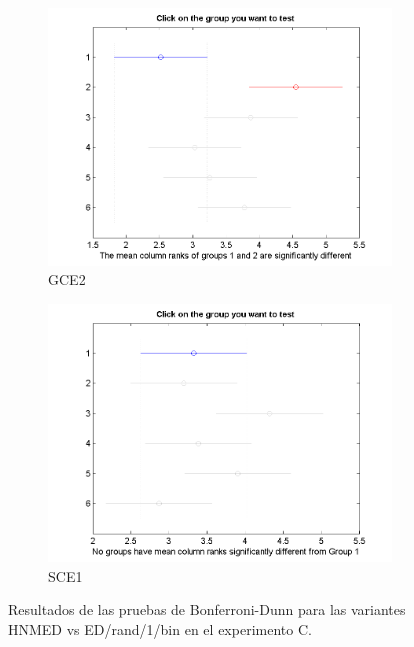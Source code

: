 \begin{figure}
\begin{subfigure}[b]{0.49\linewidth}
		\includegraphics[width=\linewidth]{Figures/D-Bonferroni_HNMED_VS_ED5}
		\caption{GCE2} \label{fig:Bon_G2} 
	\end{subfigure}
	\begin{subfigure}[b]{0.49\linewidth}
		\includegraphics[width=\linewidth]{Figures/D-Bonferroni_HNMED_VS_ED6}
		\caption{SCE1} \label{fig:Bon_S1} 
	\end{subfigure}
	\caption{Resultados de las pruebas de Bonferroni-Dunn para las variantes HNMED vs ED/rand/1/bin en el experimento C.} \label{fig: Resultados de las pruebas de Bonferroni-Dunn para las variantes HNMED vs ED/rand/1/bin en el experimento C.} 
	
\end{figure}
